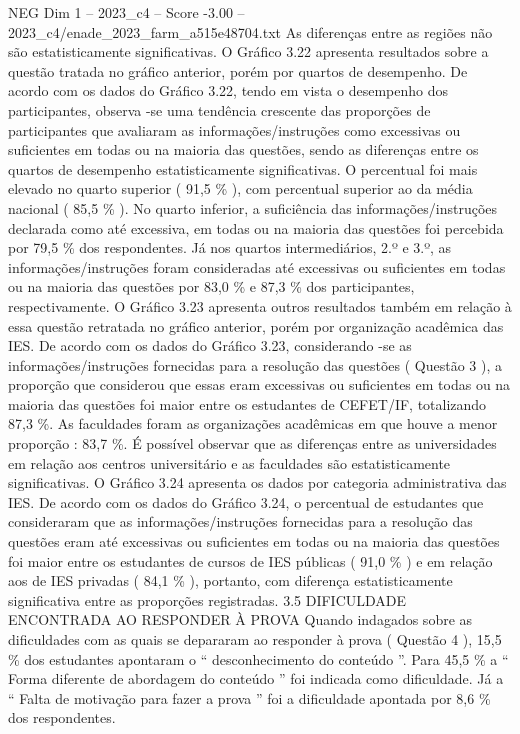 \begin{textsample}{NEG Dim 1 – 2023\_c4 – Score -3.00 – 2023\_c4/enade\_2023\_farm\_a515e48704.txt}
As diferenças entre as regiões não são estatisticamente significativas.
O Gráfico 3.22 apresenta resultados sobre a questão tratada no gráfico anterior, porém por quartos de desempenho.
De acordo com os dados do Gráfico 3.22, tendo em vista o desempenho dos participantes, observa -se uma tendência crescente das proporções de participantes que avaliaram as informações/instruções como excessivas ou suficientes em todas ou na maioria das questões, sendo as diferenças entre os quartos de desempenho estatisticamente significativas.
O percentual foi mais elevado no quarto superior ( 91,5 \% ), com percentual superior ao da média nacional ( 85,5 \% ).
No quarto inferior, a suficiência das informações/instruções declarada como até excessiva, em todas ou na maioria das questões foi percebida por 79,5 \% dos respondentes.
Já nos quartos intermediários, 2.º e 3.º, as informações/instruções foram consideradas até excessivas ou suficientes em todas ou na maioria das questões por 83,0 \% e 87,3 \% dos participantes, respectivamente.
O Gráfico 3.23 apresenta outros resultados também em relação à essa questão retratada no gráfico anterior, porém por organização acadêmica das IES.
De acordo com os dados do Gráfico 3.23, considerando -se as informações/instruções fornecidas para a resolução das questões ( Questão 3 ), a proporção que considerou que essas eram excessivas ou suficientes em todas ou na maioria das questões foi maior entre os estudantes de CEFET/IF, totalizando 87,3 \%.
As faculdades foram as organizações acadêmicas em que houve a menor proporção : 83,7 \%.
É possível observar que as diferenças entre as universidades em relação aos centros universitário e as faculdades são estatisticamente significativas.
O Gráfico 3.24 apresenta os dados por categoria administrativa das IES.
De acordo com os dados do Gráfico 3.24, o percentual de estudantes que consideraram que as informações/instruções fornecidas para a resolução das questões eram até excessivas ou suficientes em todas ou na maioria das questões foi maior entre os estudantes de cursos de IES públicas ( 91,0 \% ) e em relação aos de IES privadas ( 84,1 \% ), portanto, com diferença estatisticamente significativa entre as proporções registradas. 3.5 DIFICULDADE ENCONTRADA AO RESPONDER À PROVA Quando indagados sobre as dificuldades com as quais se depararam ao responder à prova ( Questão 4 ), 15,5 \% dos estudantes apontaram o “ desconhecimento do conteúdo ”.
Para 45,5 \% a “ Forma diferente de abordagem do conteúdo ” foi indicada como dificuldade.
Já a “ Falta de motivação para fazer a prova ” foi a dificuldade apontada por 8,6 \% dos respondentes.

\end{textsample}
